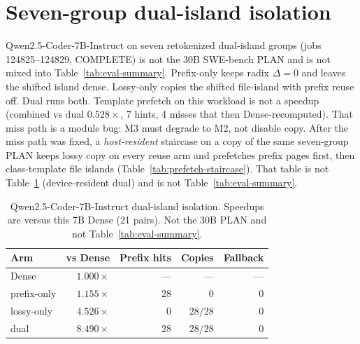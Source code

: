 \section{Seven-group dual-island isolation}
\label{app:dual}

Qwen2.5-Coder-7B-Instruct on seven retokenized dual-island groups
(jobs 124825--124829, COMPLETE) is not the 30B SWE-bench PLAN and is
not mixed into Table~\ref{tab:eval-summary}. Prefix-only keeps radix
$\Delta{=}0$ and leaves the shifted island dense. Lossy-only copies the
shifted file-island with prefix reuse off. Dual runs both. Template
prefetch on this workload is not a speedup (combined vs dual
$0.528\times$, 7 hints, 4 misses that then Dense-recomputed). That miss
path is a module bug: M3 must degrade to M2, not disable copy.
After the miss path was fixed, a \emph{host-resident} staircase on a
copy of the same seven-group PLAN keeps lossy copy on every reuse arm
and prefetches prefix pages first, then class-template file islands
(Table~\ref{tab:prefetch-staircase}). That table is not
Table~\ref{tab:7b-dual-island} (device-resident dual) and is not
Table~\ref{tab:eval-summary}.

\begin{table}[t]
\centering
\small
\caption{Qwen2.5-Coder-7B-Instruct dual-island isolation. Speedups are
versus this 7B Dense (21 pairs). Not the 30B PLAN and not
Table~\ref{tab:eval-summary}.}
\label{tab:7b-dual-island}
\begin{tabular}{lrrrr}
\toprule
\textbf{Arm} & \textbf{vs Dense} & \textbf{Prefix hits} & \textbf{Copies} & \textbf{Fallback} \\
\midrule
Dense & $1.000\times$ & --- & --- & --- \\
prefix-only & $1.155\times$ & $28$ & $0$ & $0$ \\
lossy-only & $4.526\times$ & $0$ & $28/28$ & $0$ \\
dual & $8.490\times$ & $28$ & $28/28$ & $0$ \\
\bottomrule
\end{tabular}
\end{table}

